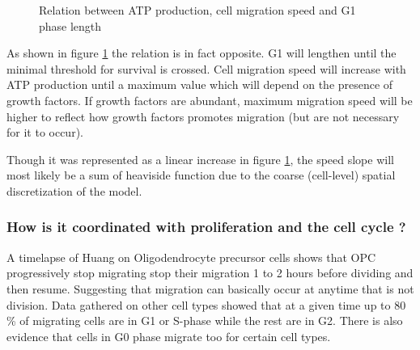 \documentclass[11pt,a4paper]{article}
\begin{document}
\begin{figure}[ht!]
\vspace{1cm}
\hspace{4cm} 
  \caption{Relation between ATP production, cell migration speed and G1 phase length \label{vcell}}
\end{figure}

As shown in figure \ref{vcell} the relation is in fact opposite. G1 will lengthen until the minimal threshold for survival is crossed. Cell migration speed will increase with ATP production until a maximum value which will depend on the presence of growth factors. If growth factors are abundant, maximum migration speed will be higher to reflect how growth factors promotes migration (but are not necessary for it to occur).

Though it was represented as a linear increase in figure \ref{vcell}, the speed slope will most likely be a sum of heaviside function due to the coarse (cell-level) spatial discretization of the model.

\subsubsection{How is it coordinated with proliferation and the cell cycle ?}
A timelapse of Huang on Oligodendrocyte precursor cells shows that OPC progressively stop migrating stop their migration 1 to 2 hours before dividing and then resume. Suggesting that migration can basically occur at anytime that is not division.\cite{Huang2020} Data gathered on other cell types showed that at a given time up to 80 \% of migrating cells are in G1 or S-phase while the rest are in G2.\cite{Alhashem2022} There is also evidence that cells in G0 phase migrate too for certain cell types.\cite{Lamb2014}
\end{document}

